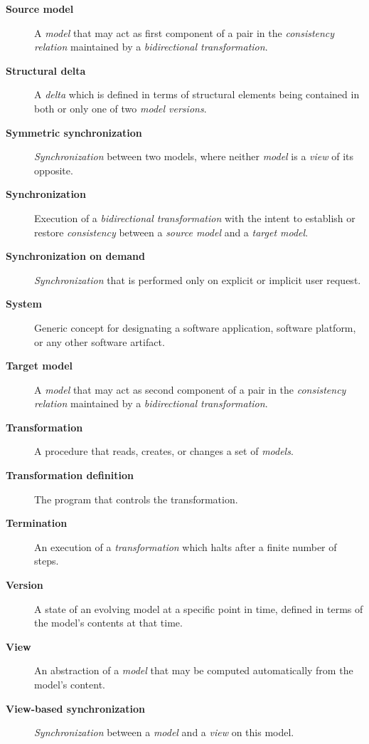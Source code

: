 \begin{description}
	\item[\textbf{Source model}] A \emph{model} that may act as first component of a pair in the \emph{consistency relation} maintained by a \emph{bidirectional transformation}. 
	\item[\textbf{Structural delta}] A \emph{delta} which is defined in terms of structural elements being contained in both or only one of two \emph{model versions}.
	\item[\textbf{Symmetric synchronization}] \emph{Synchronization} between two models, where neither \emph{model} is a \emph{view} of its opposite.
	\item[\textbf{Synchronization}] Execution of a \emph{bidirectional transformation} with the intent to establish or restore \emph{consistency} between a \emph{source model} and a \emph{target model}.
	\item[\textbf{Synchronization on demand}] \emph{Synchronization} that is performed only on explicit or implicit user request.
	\item[\textbf{System}] Generic concept for designating a software application, software platform, or any other software artifact.
	\item[\textbf{Target model}] A \emph{model} that may act as second component of a pair in the \emph{consistency relation} maintained by a \emph{bidirectional transformation}.
	\item[\textbf{Transformation}] A procedure that reads, creates, or changes a set of \emph{models}.
	\item[\textbf{Transformation definition}] The program that controls the transformation.
	\item[\textbf{Termination}] An execution of a \emph{transformation} which halts after a finite number of steps.
	\item[\textbf{Version}] A state of an evolving model at a specific point in time, defined in terms of the model's contents at that time.
	\item[\textbf{View}] An abstraction of a \emph{model} that may be computed automatically from the model's content.
	\item[\textbf{View-based synchronization}] \emph{Synchronization} between a \emph{model} and a \emph{view} on this model.
\end{description}